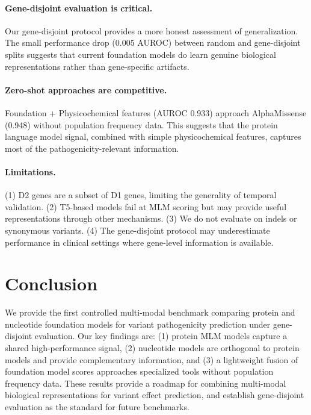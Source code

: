 \documentclass{article}
\begin{document}
\paragraph{Gene-disjoint evaluation is critical.} Our gene-disjoint protocol provides a more honest assessment of generalization. The small performance drop (0.005 AUROC) between random and gene-disjoint splits suggests that current foundation models do learn genuine biological representations rather than gene-specific artifacts.

\paragraph{Zero-shot approaches are competitive.} Foundation + Physicochemical features (AUROC 0.933) approach AlphaMissense (0.948) without population frequency data. This suggests that the protein language model signal, combined with simple physicochemical features, captures most of the pathogenicity-relevant information.

\paragraph{Limitations.} (1) D2 genes are a subset of D1 genes, limiting the generality of temporal validation. (2) T5-based models fail at MLM scoring but may provide useful representations through other mechanisms. (3) We do not evaluate on indels or synonymous variants. (4) The gene-disjoint protocol may underestimate performance in clinical settings where gene-level information is available.

\section{Conclusion}

We provide the first controlled multi-modal benchmark comparing protein and nucleotide foundation models for variant pathogenicity prediction under gene-disjoint evaluation. Our key findings are: (1) protein MLM models capture a shared high-performance signal, (2) nucleotide models are orthogonal to protein models and provide complementary information, and (3) a lightweight fusion of foundation model scores approaches specialized tools without population frequency data. These results provide a roadmap for combining multi-modal biological representations for variant effect prediction, and establish gene-disjoint evaluation as the standard for future benchmarks.



\end{document}
